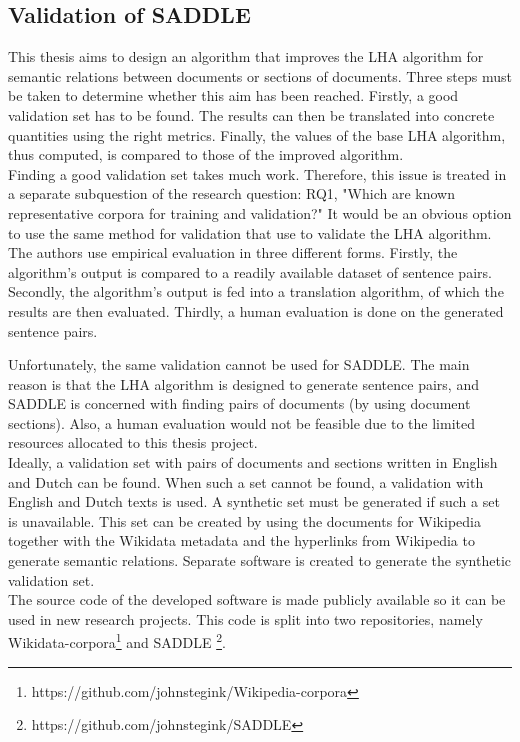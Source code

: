 \subsection{Validation of SADDLE}
This thesis aims to design an algorithm that improves the LHA algorithm for semantic relations between documents or sections of documents. Three steps must be taken to determine whether this aim has been reached. Firstly, a good validation set has to be found. The results can then be translated into concrete quantities using the right metrics. Finally, the values of the base LHA algorithm, thus computed, is compared to those of the improved algorithm.\\

Finding a good validation set takes much work. Therefore, this issue is treated in a separate subquestion of the research question: RQ1, "Which are known representative corpora for training and validation?" It would be an obvious option to use the same method for validation that \citet{nikolov2018large} use to validate the LHA algorithm. The authors use empirical evaluation in three different forms. Firstly, the algorithm's output is compared to a readily available dataset of sentence pairs. Secondly, the algorithm's output is fed into a translation algorithm, of which the results are then evaluated. Thirdly, a human evaluation is done on the generated sentence pairs.

Unfortunately, the same validation cannot be used for SADDLE. The main reason is that the LHA algorithm is designed to generate sentence pairs, and SADDLE is concerned with finding pairs of documents (by using document sections). Also, a human evaluation would not be feasible due to the limited resources allocated to this thesis project.\\

Ideally, a validation set with pairs of documents and sections written in English and Dutch can be found. When such a set cannot be found, a validation with English and Dutch texts is used. A synthetic set must be generated if such a set is unavailable. This set can be created by using the documents for Wikipedia together with the Wikidata metadata and the hyperlinks from Wikipedia to generate semantic relations. Separate software is created to generate the synthetic validation set.  \\

The source code of the developed software is made publicly available so it can be used in new research projects. This code is split into two repositories, namely Wikidata-corpora\footnote{https://github.com/johnstegink/Wikipedia-corpora} and SADDLE \footnote{https://github.com/johnstegink/SADDLE}.

